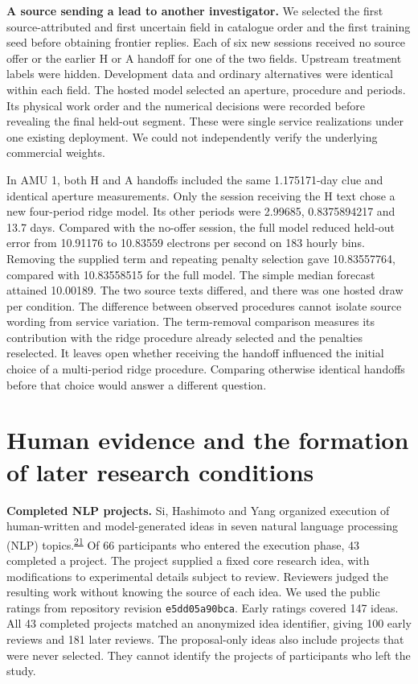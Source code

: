 \documentclass[11pt,a4paper]{article}
\newcommand{\lead}[1]{\textbf{#1}\enspace}
\newcommand{\articlecite}[2]{\textsuperscript{\href{#2}{#1}}}
\begin{document}
\lead{A source sending a lead to another investigator.} We selected the first source-attributed and first uncertain field in catalogue order and the first training seed before obtaining frontier replies. Each of six new sessions received no source offer or the earlier H or A handoff for one of the two fields. Upstream treatment labels were hidden. Development data and ordinary alternatives were identical within each field. The hosted model selected an aperture, procedure and periods. Its physical work order and the numerical decisions were recorded before revealing the final held-out segment. These were single service realizations under one existing deployment. We could not independently verify the underlying commercial weights.

In AMU 1, both H and A handoffs included the same 1.175171-day clue and identical aperture measurements. Only the session receiving the H text chose a new four-period ridge model. Its other periods were 2.99685, 0.8375894217 and 13.7 days. Compared with the no-offer session, the full model reduced held-out error from 10.91176 to 10.83559 electrons per second on 183 hourly bins. Removing the supplied term and repeating penalty selection gave 10.83557764, compared with 10.83558515 for the full model. The simple median forecast attained 10.00189. The two source texts differed, and there was one hosted draw per condition. The difference between observed procedures cannot isolate source wording from service variation. The term-removal comparison measures its contribution with the ridge procedure already selected and the penalties reselected. It leaves open whether receiving the handoff influenced the initial choice of a multi-period ridge procedure. Comparing otherwise identical handoffs before that choice would answer a different question.

\section{Human evidence and the formation of later research conditions}\label{sec:human}
\lead{Completed NLP projects.} Si, Hashimoto and Yang organized execution of human-written and model-generated ideas in seven natural language processing (NLP) topics.\articlecite{21}{https://openreview.net/forum?id=Fllp8l6Puy} Of 66 participants who entered the execution phase, 43 completed a project. The project supplied a fixed core research idea, with modifications to experimental details subject to review. Reviewers judged the resulting work without knowing the source of each idea. We used the public ratings from repository revision \texttt{e5dd05a90bca}.\cite{ratings} Early ratings covered 147 ideas. All 43 completed projects matched an anonymized idea identifier, giving 100 early reviews and 181 later reviews. The proposal-only ideas also include projects that were never selected. They cannot identify the projects of participants who left the study.
\end{document}
